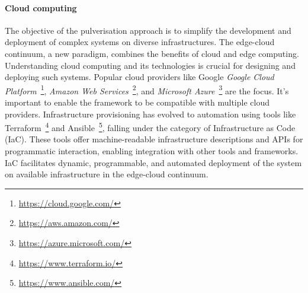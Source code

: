 \documentclass[12pt]{article}
\begin{document}
\paragraph{Cloud computing}
The objective of the pulverisation approach is to simplify the development and deployment of complex systems on diverse infrastructures.
%
The edge-cloud continuum,
a new paradigm,
combines the benefits of cloud and edge computing.
%
Understanding cloud computing and its technologies is crucial for designing and deploying such systems.
%
Popular cloud providers like Google \emph{Google Cloud Platform}~\footnote{\url{https://cloud.google.com/}},
\emph{Amazon Web Services}~\footnote{\url{https://aws.amazon.com/}},
and \emph{Microsoft Azure}~\footnote{\url{https://azure.microsoft.com/}} are the focus.
%
It's important to enable the framework to be compatible with multiple cloud providers.
%
Infrastructure provisioning has evolved to automation using tools like Terraform~\footnote{\url{https://www.terraform.io/}} and Ansible~\footnote{\url{https://www.ansible.com/}},
falling under the category of Infrastructure as Code (IaC).
%
These tools offer machine-readable infrastructure descriptions and APIs for programmatic interaction,
enabling integration with other tools and frameworks.
%
IaC facilitates dynamic, programmable, and automated deployment of the system on available infrastructure in the edge-cloud continuum.
\end{document}
